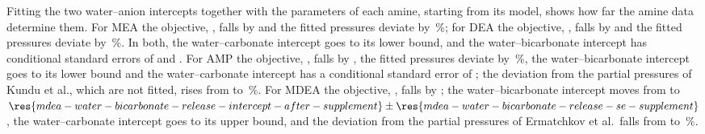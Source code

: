 \documentclass[a4paper,11pt]{article}
\begin{document}
Fitting the two water--anion intercepts together with the parameters of each amine, starting from its model, shows how far the amine data determine them.
For MEA the objective, , falls by  and the fitted pressures deviate by \,\%; for DEA the objective, , falls by  and the fitted pressures deviate by \,\%.
In both, the water--carbonate intercept goes to its lower bound, and the water--bicarbonate intercept has conditional standard errors of  and .
For AMP the objective, , falls by , the fitted pressures deviate by \,\%, the water--bicarbonate intercept goes to its lower bound and the water--carbonate intercept has a conditional standard error of ; the deviation from the \COtwo partial pressures of Kundu et al., which are not fitted, rises from  to \,\%.
For MDEA the objective, , falls by ; the water--bicarbonate intercept moves from  to $\res{mdea-water-bicarbonate-release-intercept-after-supplement}\pm\res{mdea-water-bicarbonate-release-se-supplement}$, the water--carbonate intercept goes to its upper bound, and the deviation from the \COtwo partial pressures of Ermatchkov et al.\ falls from  to \,\%.
\end{document}
